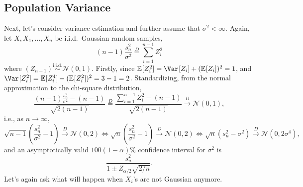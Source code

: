 \subsection{Population Variance}
Next, let's consider variance estimation and further assume that \(\sigma ^2 < \infty \). Again, let \(X, X_1, \dots , X_n\) be i.i.d.\ Gaussian random samples,
\[
	(n-1) \frac{s_n^2}{\sigma ^2}
	\overset{D}{=} \sum_{i=1}^{n-1} Z_i^2
\]
where \((Z_{n-1}) \overset{\text{i.i.d.} }{\sim } \mathcal{N} (0, 1)\). Firstly, since \(\mathbb{E}_{}[Z_i^2] = \Var_{}[Z_i] + (\mathbb{E}_{}[Z_i] )^2 = 1\), and \(\Var_{}[Z_i^2] = \mathbb{E}_{}[Z_i^4] - (\mathbb{E}_{}[Z_i^2] )^2 = 3 - 1 = 2\). Standardizing, from the normal approximation to the chi-square distribution,
\[
	\frac{(n-1) \frac{s_n^2}{\sigma ^2} - (n - 1)}{\sqrt{2 (n-1)} }
	\overset{D}{=} \frac{\sum_{i=1}^{n-1} Z_i^2 - (n-1)}{\sqrt{2 (n-1)} }
	\overset{D}{\to } \mathcal{N} (0, 1),
\]
i.e., as \(n \to \infty \),
\[
	\sqrt{n-1} \left( \frac{s_n^2}{\sigma ^2} - 1 \right)  \overset{D}{\to } \mathcal{N} (0, 2)
	\iff \sqrt{n} \left( \frac{s_n^2}{\sigma ^2} - 1 \right)  \overset{D}{\to } \mathcal{N} (0, 2)
	\iff \sqrt{n} (s_n^2 - \sigma ^2) \overset{D}{\to } \mathcal{N} (0, 2 \sigma ^4),
\]
and an asymptotically valid \(100 (1 - \alpha )\%\) confidence interval for \(\sigma ^2\) is
\[
	\frac{s_n^2}{1 \pm Z_{\alpha / 2} \sqrt{2 / n} }.
\]
Let's again ask what will happen when \(X_i\)'s are not Gaussian anymore.

